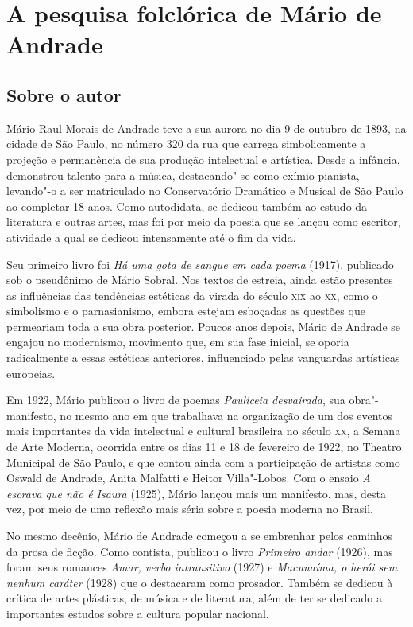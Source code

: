 \chapter{A pesquisa folclórica de Mário de Andrade}

\section{Sobre o autor}

Mário Raul Morais de Andrade teve a sua aurora no dia 9 de outubro de
1893, na cidade de São Paulo, no número 320 da rua que carrega
simbolicamente a projeção e permanência de sua produção intelectual e
artística. Desde a infância, demonstrou talento para a música,
destacando"-se como exímio pianista, levando"-o a ser matriculado no
Conservatório Dramático e Musical de São Paulo ao completar 18 anos.
Como autodidata, se dedicou também ao estudo da literatura e outras
artes, mas foi por meio da poesia que se lançou como escritor, atividade
a qual se dedicou intensamente até o fim da vida.

Seu primeiro livro foi \emph{Há uma gota de sangue em cada poema}
(1917), publicado sob o pseudônimo de Mário Sobral. Nos textos de
estreia, ainda estão presentes as influências das tendências estéticas
da virada do século \textsc{xix} ao \textsc{xx}, como o simbolismo e o parnasianismo,
embora estejam esboçadas as questões que permeariam toda a sua obra
posterior. Poucos anos depois, Mário de Andrade se engajou no
modernismo, movimento que, em sua fase inicial, se oporia radicalmente a
essas estéticas anteriores, influenciado pelas vanguardas artísticas
europeias.

Em 1922, Mário publicou o livro de poemas \emph{Pauliceia desvairada},
sua obra"-manifesto, no mesmo ano em que trabalhava na organização de um
dos eventos mais importantes da vida intelectual e cultural brasileira
no século \textsc{xx}, a Semana de Arte Moderna, ocorrida entre os dias 11 e 18
de fevereiro de 1922, no Theatro Municipal de São Paulo, e que contou
ainda com a participação de artistas como Oswald de Andrade, Anita
Malfatti e Heitor Villa"-Lobos. Com o ensaio \emph{A escrava que não é
Isaura} (1925), Mário lançou mais um manifesto, mas, desta vez, por meio
de uma reflexão mais séria sobre a poesia moderna no Brasil.

No mesmo decênio, Mário de Andrade começou a se embrenhar pelos caminhos
da prosa de ficção. Como contista, publicou o livro \emph{Primeiro
andar} (1926), mas foram seus romances \emph{Amar, verbo intransitivo}
(1927) e \emph{Macunaíma, o herói sem nenhum caráter} (1928) que o
destacaram como prosador. Também se dedicou à crítica de artes
plásticas, de música e de literatura, além de ter se dedicado a
importantes estudos sobre a cultura popular nacional.

